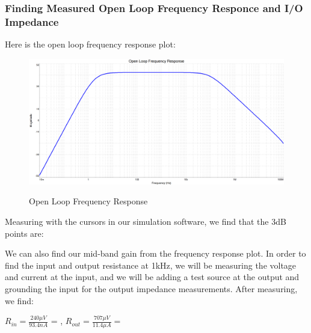 \documentclass[12pt]{article}
\begin{document}
\subsubsection{Finding Measured Open Loop Frequency Responce and I/O Impedance}
Here is the open loop frequency response plot:
\begin{figure}[h!]
    \centering
    \includegraphics[height=0.35\textwidth]{Images/partCbode.png}\\
    \caption{Open Loop Frequency Response}
    \label{fig:olfreqresponse}
\end{figure}
\FloatBarrier
Measuring with the cursors in our simulation software, we find that the 
3dB points are: 
\begin{center}
\end{center}
We can also find our mid-band gain  from the frequency 
response plot.
In order to find the input and output resistance at 1kHz, we will be measuring the voltage 
and current at the input, and we will be adding a test source at the output and grounding the
input for the output impedance measurements. After measuring, we find: 
\begin{center}
$R_{in} = \frac{240\mu V}{93.4nA}$ = , 
$R_{out} = \frac{707\mu V}{11.4 \mu A} = $ \boxed{62.017\Omega}
\end{center}
\end{document}
